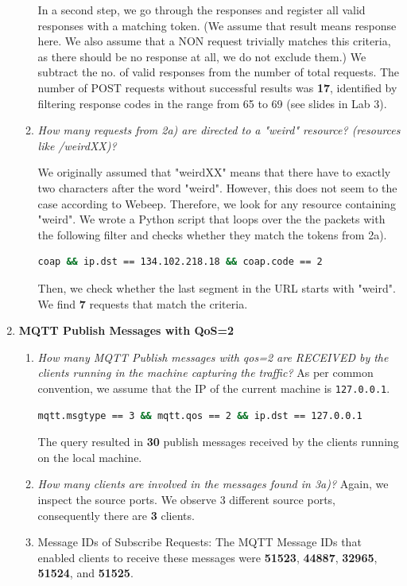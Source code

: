 \documentclass{article}
\begin{document}
\begin{enumerate}
\begin{enumerate}
        In a second step, we go through the responses and register all valid responses with a matching token. (We assume that result means response here. We also assume that a NON request trivially matches this criteria, as there should be no response at all, we do not exclude them.) We subtract the no. of valid responses from the number of total requests.
        The number of POST requests without successful results was \textbf{17}, identified by filtering response codes in the range from 65 to 69 (see slides in Lab 3).
        \item 
        \textit{How many requests from 2a) are directed to a "weird"
resource? (resources like /weirdXX)?}

        We originally assumed that "weirdXX" means that there have to exactly two characters after the word "weird". However, this does not seem to the case according to Webeep. Therefore, we look for any resource containing "weird". We wrote a Python script that loops over the the packets with the following filter and checks whether they match the tokens from 2a).
        \begin{lstlisting}[language=bash]
coap && ip.dst == 134.102.218.18 && coap.code == 2
        \end{lstlisting}
        Then, we check whether the last segment in the URL starts with "weird". We find \textbf{7} requests that match the criteria.
    \end{enumerate}

    \item \textbf{MQTT Publish Messages with QoS=2}
    \begin{enumerate}
        \item \textit{How many MQTT Publish messages with qos=2 are RECEIVED by
the clients running in the machine capturing the traffic?}
        As per common convention, we assume that the IP of the current machine is \texttt{127.0.0.1}.
        \begin{lstlisting}[language=bash]
mqtt.msgtype == 3 && mqtt.qos == 2 && ip.dst == 127.0.0.1
        \end{lstlisting}
        The query resulted in \textbf{30} publish messages received by the clients running on the local machine.
        \item 
        \textit{How many clients are involved in the messages found in 3a)?}
        Again, we inspect the source ports. We observe 3 different source ports, consequently there are \textbf{3} clients.
        \item Message IDs of Subscribe Requests:
        The MQTT Message IDs that enabled clients to receive these messages were \textbf{51523}, \textbf{44887}, \textbf{32965}, \textbf{51524}, and \textbf{51525}.
    \end{enumerate}


\end{enumerate}
\end{document}
